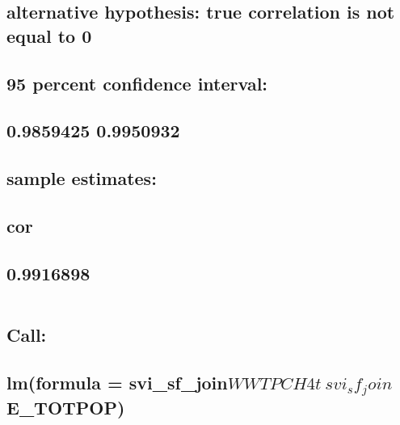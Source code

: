\documentclass[
  12pt,
]{article}
\begin{document}
\hypertarget{alternative-hypothesis-true-correlation-is-not-equal-to-0-3}{%
\subsection{alternative hypothesis: true correlation is not equal to
0}\label{alternative-hypothesis-true-correlation-is-not-equal-to-0-3}}

\hypertarget{percent-confidence-interval-3}{%
\subsection{95 percent confidence
interval:}\label{percent-confidence-interval-3}}

\hypertarget{section-32}{%
\subsection{0.9859425 0.9950932}\label{section-32}}

\hypertarget{sample-estimates-3}{%
\subsection{sample estimates:}\label{sample-estimates-3}}

\hypertarget{cor-3}{%
\subsection{cor}\label{cor-3}}

\hypertarget{section-33}{%
\subsection{0.9916898}\label{section-33}}

\begin{verbatim}
\end{verbatim}

\hypertarget{section-34}{%
\subsection{}\label{section-34}}

\hypertarget{call-3}{%
\subsection{Call:}\label{call-3}}

\hypertarget{lmformula-svi_sf_joinwwtpch4t-svi_sf_joine_totpop}{%
\subsection{\texorpdfstring{lm(formula =
svi\_sf\_join\(WWTPCH4t ~ svi_sf_join\)E\_TOTPOP)}{lm(formula = svi\_sf\_joinWWTPCH4t \textasciitilde{} svi\_sf\_joinE\_TOTPOP)}}\label{lmformula-svi_sf_joinwwtpch4t-svi_sf_joine_totpop}}
\end{document}
